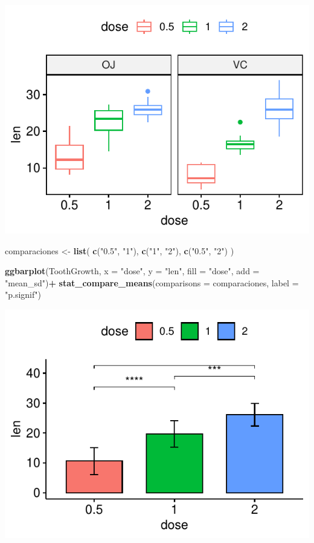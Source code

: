 \documentclass[
]{book}
\newenvironment{Shaded}{\begin{snugshade}}{\end{snugshade}}
\newcommand{\AttributeTok}[1]{\textcolor[rgb]{0.13,0.29,0.53}{#1}}
\newcommand{\FunctionTok}[1]{\textcolor[rgb]{0.13,0.29,0.53}{\textbf{#1}}}
\newcommand{\NormalTok}[1]{#1}
\newcommand{\OtherTok}[1]{\textcolor[rgb]{0.56,0.35,0.01}{#1}}
\newcommand{\SpecialCharTok}[1]{\textcolor[rgb]{0.81,0.36,0.00}{\textbf{#1}}}
\newcommand{\StringTok}[1]{\textcolor[rgb]{0.31,0.60,0.02}{#1}}
\begin{document}
\begin{center}\includegraphics{_main_files/figure-latex/unnamed-chunk-228-1} \end{center}

\begin{Shaded}
\begin{Highlighting}[]
\NormalTok{comparaciones }\OtherTok{\textless{}{-}} \FunctionTok{list}\NormalTok{( }\FunctionTok{c}\NormalTok{(}\StringTok{"0.5"}\NormalTok{, }\StringTok{"1"}\NormalTok{), }\FunctionTok{c}\NormalTok{(}\StringTok{"1"}\NormalTok{, }\StringTok{"2"}\NormalTok{), }\FunctionTok{c}\NormalTok{(}\StringTok{"0.5"}\NormalTok{, }\StringTok{"2"}\NormalTok{) )}

\FunctionTok{ggbarplot}\NormalTok{(ToothGrowth, }\AttributeTok{x =} \StringTok{"dose"}\NormalTok{, }\AttributeTok{y =} \StringTok{"len"}\NormalTok{, }\AttributeTok{fill =} \StringTok{"dose"}\NormalTok{, }\AttributeTok{add =} \StringTok{"mean\_sd"}\NormalTok{)}\SpecialCharTok{+}
  \FunctionTok{stat\_compare\_means}\NormalTok{(}\AttributeTok{comparisons =}\NormalTok{ comparaciones, }\AttributeTok{label =} \StringTok{"p.signif"}\NormalTok{)}
\end{Highlighting}
\end{Shaded}

\begin{center}\includegraphics{_main_files/figure-latex/unnamed-chunk-228-2} \end{center}
\end{document}
